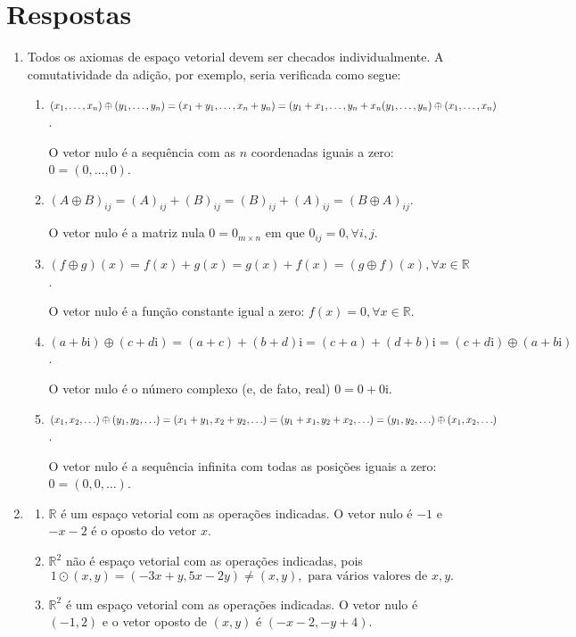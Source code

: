 \documentclass[12pt,a4paper]{article}
\newcommand\ii{\mathrm{i}}
\newcommand*\R{\mathbb{R}}
\begin{document}
\newpage
\section*{Respostas}

\begin{enumerate}
\item Todos os axiomas de espaço vetorial devem ser checados individualmente. A comutatividade da adição, por exemplo, seria verificada como segue:
\begin{enumerate}
\item
$(x_1, \ldots, x_n) \oplus (y_1, \ldots, y_n)
= (x_1 + y_1, \ldots, x_n + y_n) \\
= (y_1 + x_1, \ldots, y_n + x_n
(y_1, \ldots, y_n) \oplus (x_1, \ldots, x_n)$.

O vetor nulo é a sequência com as $n$ coordenadas iguais a zero: $0 = (0, \ldots, 0)$.

\item
$(A \oplus B)_{ij}
= (A)_{ij} + (B)_{ij}
= (B)_{ij} + (A)_{ij}
= (B \oplus A)_{ij}$.

O vetor nulo é a matriz nula $0 = 0_{m \times n}$ em que $0_{ij} = 0, \forall i,j$. 

\item 
$(f \oplus g)(x)
= f(x) + g(x)
= g(x) + f(x)
= (g \oplus f)(x), \forall x \in \R$.

O vetor nulo é a função constante igual a zero: $f(x) = 0, \forall x \in \R$.

\item 
$(a + b \ii) \oplus (c + d \ii)
= (a + c) + (b + d) \ii
= (c + a) + (d + b) \ii
= (c + d \ii) \oplus (a + b \ii)$.

O vetor nulo é o número complexo (e, de fato, real) $0 = 0 + 0 \ii$.

\item 
$(x_1, x_2, \ldots) \oplus (y_1, y_2, \ldots)
= (x_1 + y_1, x_2 + y_2, \ldots) \\
= (y_1 + x_1, y_2 + x_2, \ldots)
= (y_1, y_2, \ldots) \oplus (x_1, x_2, \ldots)$.

O vetor nulo é a sequência infinita com todas as posições iguais a zero: $0 = (0, 0, \ldots)$.

\end{enumerate}

\item 
\begin{enumerate}
\item $\R$ é um espaço vetorial com as operações indicadas. O vetor nulo é $-1$ e $-x-2$ é o oposto do vetor $x$.
\item $\R^2$ não é espaço vetorial com as operações indicadas, pois
\[1 \odot(x,y) = (-3x+y,5x-2y) \neq (x,y), \text{ para vários valores de }x,y.\]
\item $\R^2$ é um espaço vetorial com as operações indicadas. O vetor nulo é $(-1, 2)$ e o vetor oposto de $(x,y)$ é $(-x-2, -y+4)$.
\end{enumerate}


\end{enumerate}
\end{document}
